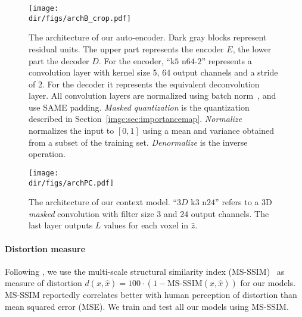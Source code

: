 \begin{figure}
\centering
\texttt{[image: \\dir/figs/archB\_crop.pdf]}
\caption{The architecture of our auto-encoder. Dark gray blocks represent residual units. The upper part represents the encoder $E$, the lower part the decoder $D$. For the encoder, ``$\text{k}5\text{ n}64\text{-}2$'' represents a convolution layer with kernel size 5, 64 output channels and a stride of 2. For the decoder it represents the equivalent deconvolution layer. All convolution layers are normalized using batch norm~\cite{ioffe2015batch}, and use SAME padding. \textit{Masked quantization} is the quantization described in Section~\ref{imgc:sec:importancemap}. \textit{Normalize} normalizes the input to $[0, 1]$ using a mean and variance obtained from a subset of the training set. \textit{Denormalize} is the inverse operation.}
\label{imgc:fig:archAE}
\end{figure}

\begin{figure}
\centering
\texttt{[image: \\dir/figs/archPC.pdf]}
\caption{The architecture of our context model. ``$3D\text{ k}3\text{ n}24$'' refers to a 3D \textit{masked} convolution with filter size 3 and 24 output channels. The last layer outputs $L$ values for each voxel in $\hat z$.}
\label{imgc:fig:archPC}
\end{figure}

\paragraph{Distortion measure} Following \cite{johnston2018improved, rippel17a}, we use the multi-scale structural similarity index (MS-SSIM)~\cite{SSIM-MS} as measure of distortion $d(x,\hat x)=100\cdot(1-\text{MS-SSIM}(x,\hat x))$ for our models. MS-SSIM reportedly correlates better with human perception of distortion than mean squared error (MSE). We train and test all our models using MS-SSIM.


